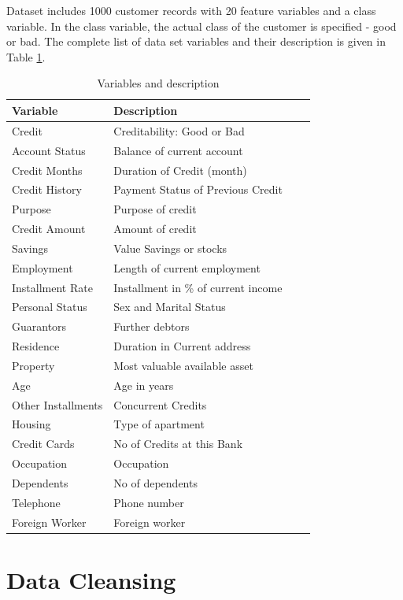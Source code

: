 \documentclass[sigconf]{acmart}
\begin{document}
Dataset includes 1000 customer records with 20 feature variables and a class variable. In the class variable, the actual class of the customer is specified - good or bad. The complete list of data set variables and their description is given in Table \ref{tab:table1}. 

\begin{table}
  \caption{Variables and description
  \cite{psu-site}}
  \label{tab:table1}
  \begin{tabular}{llcc}
    \toprule
     Variable& Description\\
    \midrule
    Credit& Creditability: Good or Bad\\
    Account Status& Balance of current account\\
    Credit Months& Duration of Credit (month)\\
    Credit History& Payment Status of Previous Credit\\
    Purpose& Purpose of credit\\
    Credit Amount& Amount of credit\\
    Savings& Value Savings or stocks\\
    Employment& Length of current employment\\
    Installment Rate& Installment in \% of current income\\
    Personal Status& Sex and Marital Status\\
    Guarantors& Further debtors\\
    Residence& Duration in Current address\\
    Property& Most valuable available asset\\
    Age& Age in years\\
    Other Installments& Concurrent Credits\\
    Housing& Type of apartment\\
    Credit Cards& No of Credits at this Bank\\
    Occupation& Occupation\\
    Dependents& No of dependents\\
    Telephone& Phone number\\
    Foreign Worker& Foreign worker\\
    \bottomrule
  \end{tabular}
\end{table}


\section{Data Cleansing}
\end{document}
